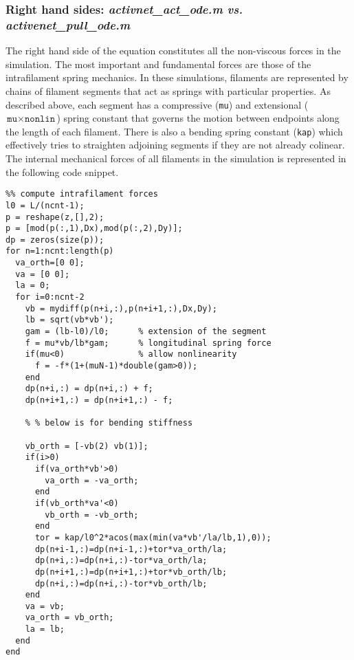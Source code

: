 \subsubsection{Right hand sides: \textit{activnet\_act\_ode.m vs. activenet\_pull\_ode.m}}

The right hand side of the equation constitutes all the non-viscous forces in the simulation.  The most important and fundamental forces are those of the intrafilament spring mechanics.  In these simulations, filaments are represented by chains of filament segments that act as springs with particular properties.  As described above, each segment has a compressive (\texttt{mu}) and extensional ($\texttt{mu}\times\texttt{nonlin}$) spring constant that governs the motion between endpoints along the length of each filament.  There is also a bending spring constant (\texttt{kap}) which effectively tries to straighten adjoining segments if they are not already colinear.  The internal mechanical forces of all filaments in the simulation is represented in the following code snippet.

\begin{verbatim}
%% compute intrafilament forces    
l0 = L/(ncnt-1);
p = reshape(z,[],2);
p = [mod(p(:,1),Dx),mod(p(:,2),Dy)];
dp = zeros(size(p));
for n=1:ncnt:length(p)
  va_orth=[0 0];
  va = [0 0];
  la = 0;
  for i=0:ncnt-2
    vb = mydiff(p(n+i,:),p(n+i+1,:),Dx,Dy);
    lb = sqrt(vb*vb');
    gam = (lb-l0)/l0;      % extension of the segment
    f = mu*vb/lb*gam;      % longitudinal spring force
    if(mu<0)               % allow nonlinearity
      f = -f*(1+(muN-1)*double(gam>0));
    end
    dp(n+i,:) = dp(n+i,:) + f;
    dp(n+i+1,:) = dp(n+i+1,:) - f;
    
    % % below is for bending stiffness
    
    vb_orth = [-vb(2) vb(1)];
    if(i>0)
      if(va_orth*vb'>0)
        va_orth = -va_orth;
      end
      if(vb_orth*va'<0)
        vb_orth = -vb_orth;
      end
      tor = kap/l0^2*acos(max(min(va*vb'/la/lb,1),0));
      dp(n+i-1,:)=dp(n+i-1,:)+tor*va_orth/la;
      dp(n+i,:)=dp(n+i,:)-tor*va_orth/la;
      dp(n+i+1,:)=dp(n+i+1,:)+tor*vb_orth/lb;
      dp(n+i,:)=dp(n+i,:)-tor*vb_orth/lb;
    end
    va = vb;
    va_orth = vb_orth;
    la = lb;
  end
end
\end{verbatim}

